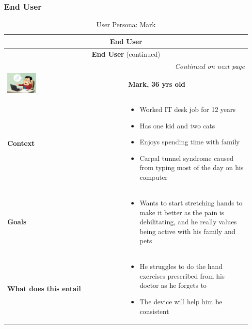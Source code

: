 \documentclass{article}
\begin{document}
\subsubsection{End User}
\begin{longtable}{|p{}|p{}|}
    \caption{User Persona: Mark} \label{table:user_persona} \\
    \hline
    \multicolumn{2}{|c|}{\textbf{End User}} \\ 
    \hline
    \endfirsthead

    \hline
    \multicolumn{2}{|c|}{\textbf{End User} (continued)} \\ 
    \hline
    \endhead

    \hline
    \multicolumn{2}{|r|}{\textit{Continued on next page}} \\ 
    \hline
    \endfoot

    \hline
    \endlastfoot

    \includegraphics[width=0.25\textwidth]{guy.jpg} & \textbf{Mark, 36 yrs old} \\ 
    \hline
    \textbf{Context} &
    \begin{itemize}
        \item Worked IT desk job for 12 years
        \item Has one kid and two cats
        \item Enjoys spending time with family
        \item Carpal tunnel syndrome caused from typing most of the day on his computer
    \end{itemize} \\
    \hline
    \textbf{Goals} &
    \begin{itemize}
        \item Wants to start stretching hands to make it better as the pain is debilitating, and he really values being active with his family and pets
    \end{itemize} \\
    \hline
    \textbf{What does this entail} &
    \begin{itemize}
        \item He struggles to do the hand exercises prescribed from his doctor as he forgets to
        \item The device will help him be consistent
    \end{itemize} \\
    \hline
\end{longtable}
\end{document}
